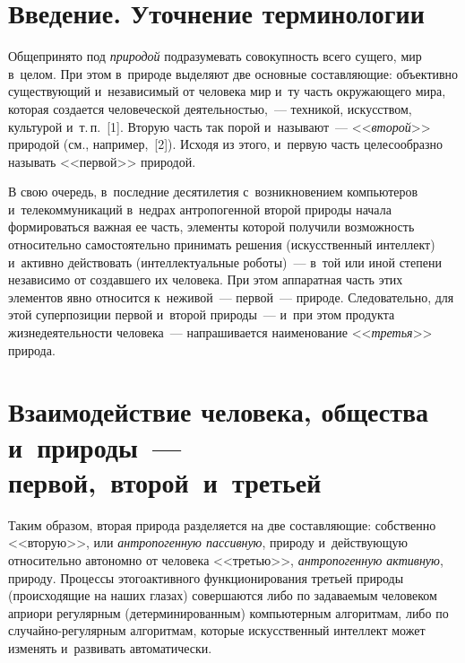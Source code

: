   



\thispagestyle{headings}

\begin{multicols}{2}

\label{st\stat}
  
\section{Введение. Уточнение терминологии}

  Общепринято под \textit{природой} подразумевать совокупность всего 
сущего, мир в~целом. При этом в~природе выделяют две основные 
составляющие: объективно существующий и~независимый от человека мир и~ту 
часть окружающего мира, которая создается человеческой деятельностью,~--- 
техникой, искусством, культурой и~т.\,п.~[1]. Вторую часть так порой 
и~называют~--- <<\textit{второй}>> природой (см., например,~[2]). Исходя из 
этого, и~первую часть целесообразно называть <<первой>> природой. 
  
  В свою очередь, в~последние десятилетия с~возникновением компьютеров 
и~телекоммуникаций в~недрах антропогенной второй природы начала 
формироваться важная ее часть, элементы которой получили возможность 
относительно самостоятельно принимать решения (искусственный интеллект) 
и~активно действовать (интеллектуальные роботы)~--- в~той или иной степени 
независимо от создавшего их человека. При этом аппаратная часть этих 
элементов явно относится к~неживой~--- первой~--- природе. Следовательно, 
для этой суперпозиции первой и~второй природы~--- и~при этом продукта 
жизнедеятельности человека~--- напрашивается наименование 
<<\textit{третья}>> природа.
  
\section{Взаимодействие человека, общества и~природы~--- первой,~второй~и~третьей}

  Таким образом, вторая природа разделяется на две составляющие: 
собственно <<вторую>>, или \textit{ант\-ро\-по\-ген\-ную пассивную}, природу 
и~действующую относительно автономно от человека <<третью>>, 
\textit{ант\-ро\-по\-ген\-ную активную}, природу. Процессы этого\linebreak активного 
функционирования третьей природы (происходящие на наших глазах) 
совершаются либо по задаваемым человеком априори регулярным 
(детерминированным) компьютерным алгоритмам, либо по 
слу\-чай\-но-ре\-гу\-ляр\-ным алгоритмам, которые искусственный интеллект может изменять 
и~развивать автоматически.


\end{multicols}
